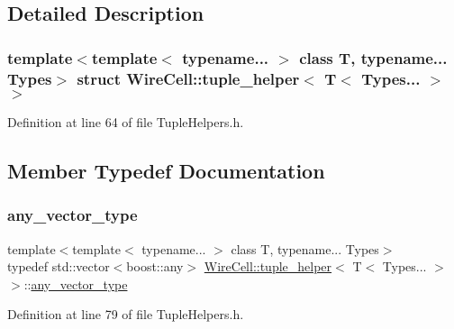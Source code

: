 \subsection{Detailed Description}
\subsubsection*{template$<$template$<$ typename... $>$ class T, typename... Types$>$\newline
struct Wire\+Cell\+::tuple\+\_\+helper$<$ T$<$ Types... $>$ $>$}



Definition at line 64 of file Tuple\+Helpers.\+h.



\subsection{Member Typedef Documentation}
\mbox{\label{struct_wire_cell_1_1tuple__helper_3_01_t_3_01_types_8_8_8_01_4_01_4_a09d92f40f36eccfe85165e6ab93a6217}} 
\subsubsection{\texorpdfstring{any\+\_\+vector\+\_\+type}{any\_vector\_type}}
{\footnotesize\ttfamily template$<$template$<$ typename... $>$ class T, typename... Types$>$ \\
typedef std\+::vector$<$boost\+::any$>$ \hyperlink{struct_wire_cell_1_1tuple__helper}{Wire\+Cell\+::tuple\+\_\+helper}$<$ T$<$ Types... $>$ $>$\+::\hyperlink{struct_wire_cell_1_1tuple__helper_3_01_t_3_01_types_8_8_8_01_4_01_4_a09d92f40f36eccfe85165e6ab93a6217}{any\+\_\+vector\+\_\+type}}



Definition at line 79 of file Tuple\+Helpers.\+h.

\mbox{\label{struct_wire_cell_1_1tuple__helper_3_01_t_3_01_types_8_8_8_01_4_01_4_aef55cc988f5f41eff16f4a116bbd5fc5}} 
